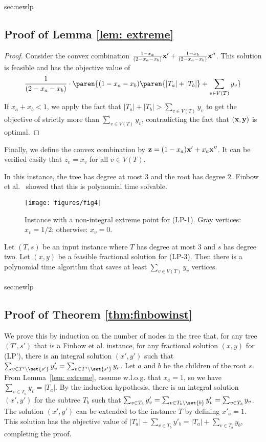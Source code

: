 \begin{appendixproof}{sec:newlp}{\subsection{Proof of Lemma \ref{lem: extreme}}}
\begin{proof}
Consider the convex combination $\frac{1-x_a}{(2-x_a-x_b)} {\bf x'} + \frac{1-x_b}{(2-x_a-x_b)} {\bf x''}$. 
This solution is feasible and has the objective value of 
$$\frac{1}{(2-x_a-x_b)}\cdot \paren{ (1-x_a -x_b) \paren{|T_a| + |T_b|}+ \sum_{v \in V(T)} y_v}$$
If $x_a + x_b <1$, we apply the fact that $|T_a| + |T_b| > \sum_{v \in V(T)} y_v$ to get the objective of strictly more than $\sum_{v \in V(T)} y_v$, contradicting the fact that $({\bf x}, {\bf y})$ is optimal.  
\end{proof} 

Finally, we define the convex combination by ${\bf z}= (1-x_a) {\bf x'}  + x_a {\bf x''}$.
It can be verified easily that $z_v = x_v$ for all $v \in V(T)$.  
\end{appendixproof} 

\vspace{0.1in} 

 In this instance, the tree has degree at most $3$ and the root has degree $2$.  
Finbow et al.~\cite{FinbowG09} showed that this is polynomial time solvable. 

\begin{wrapfigure}[11]{r}{0.25\textwidth}
\centering
\texttt{[image: figures/fig4]}
\caption{Instance with a non-integral extreme point for (LP-1). Gray vertices: $x_v=1/2$; otherwise: $x_v = 0$.}
\label{fig:lp1badcase}
\end{wrapfigure}

\begin{theorem} 
Let $(T,s)$ be an input instance where $T$ has degree at most $3$ and $s$ has degree two. Let $(x,y)$ be a feasible fractional solution for (LP-3). 
Then there is a polynomial time algorithm that saves at least $\sum_{v \in V(T)} y_v$ vertices. 
\label{thm:finbowinst}
\end{theorem}  
\begin{appendixproof}{sec:newlp}{\subsection{Proof of Theorem \ref{thm:finbowinst}}}
We prove this by induction on the number of nodes in the tree that, for any tree $(T',s')$ that is a Finbow et al. instance, for any fractional solution $(x,y)$ for (LP'), there is an integral solution $(x',y')$ such that $\sum_{v \in T' \setminus \set{s'}} y'_v = \sum_{v \in T' \setminus \set{s'}} y_v$.  
Let $a$ and $b$ be the children of the root $s$.
From Lemma~\ref{lem: extreme}, assume w.l.o.g. that $x_a = 1$, so we have $\sum_{v \in T_a} y_v = |T_a|$. 
By the induction hypothesis, there is an integral solution $(x',y')$ for the subtree $T_b$ such that $\sum_{v \in T_b} y'_v = \sum_{v \in T_b \setminus \set{b}} y'_v = \sum_{v \in T_b} y_v$.  
The solution $(x',y')$ can be extended to the instance $T$ by defining $x'_a = 1$. 
This solution has the objective value of $|T_a| + \sum_{v \in T_b} y'_b = |T_a| + \sum_{v \in T_b} y_b$, completing the proof. 
\end{appendixproof}

